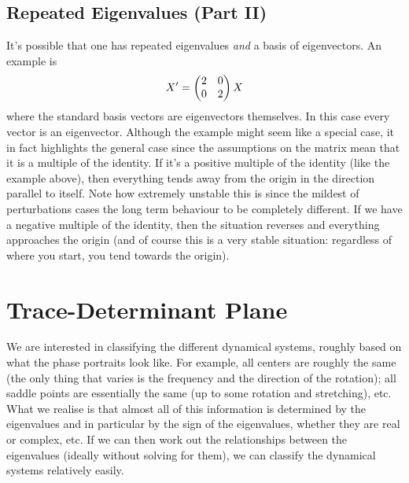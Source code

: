 
\subsection{Repeated Eigenvalues (Part II)}
It's possible that one has repeated eigenvalues \textit{and} a basis of eigenvectors. An example is
\begin{equation}
    X' = \begin{pmatrix} 2 & 0 \\ 0 & 2 \end{pmatrix} X
\end{equation}
where the standard basis vectors are eigenvectors themselves. In this case every vector is an eigenvector. Although the example might seem like a special case, it in fact highlights the general case since the assumptions on the matrix mean that it is a multiple of the identity. If it's a positive multiple of the identity (like the example above), then everything tends away from the origin in the direction parallel to itself. Note how extremely unstable this is since the mildest of perturbations cases the long term behaviour to be completely different. If we have a negative multiple of the identity, then the situation reverses and everything approaches the origin (and of course this is a very stable situation: regardless of where you start, you tend towards the origin).


\section{Trace-Determinant Plane}
We are interested in classifying the different dynamical systems, roughly based on what the phase portraits look like. For example, all centers are roughly the same (the only thing that varies is the frequency and the direction of the rotation); all saddle points are essentially the same (up to some rotation and stretching), etc. What we realise is that almost all of this information is determined by the eigenvalues and in particular by the sign of the eigenvalues, whether they are real or complex, etc. If we can then work out the relationships between the eigenvalues (ideally without solving for them), we can classify the dynamical systems relatively easily.

